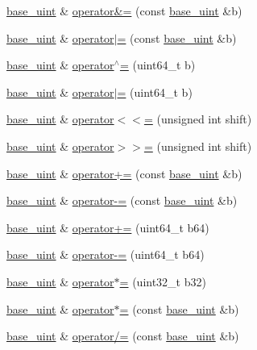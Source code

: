 \begin{DoxyCompactItemize}
\item 
\hyperlink{classbase__uint}{base\+\_\+uint} \& \hyperlink{classbase__uint_a6cb549b322e5bbcca794366f5fd3fb15}{operator\&=} (const \hyperlink{classbase__uint}{base\+\_\+uint} \&b)
\item 
\hyperlink{classbase__uint}{base\+\_\+uint} \& \hyperlink{classbase__uint_ab116d89cbae68b32fbecf5d1de98bb2e}{operator$\vert$=} (const \hyperlink{classbase__uint}{base\+\_\+uint} \&b)
\item 
\hyperlink{classbase__uint}{base\+\_\+uint} \& \hyperlink{classbase__uint_a3d77324f5c5166e4dabadac360bea6e7}{operator$^\wedge$=} (uint64\+\_\+t b)
\item 
\hyperlink{classbase__uint}{base\+\_\+uint} \& \hyperlink{classbase__uint_ac8edb6e097d9eede21f8fa44e9184913}{operator$\vert$=} (uint64\+\_\+t b)
\item 
\hyperlink{classbase__uint}{base\+\_\+uint} \& \hyperlink{classbase__uint_acb449d2fcb5af767fa6b01890e836a4e}{operator$<$$<$=} (unsigned int shift)
\item 
\hyperlink{classbase__uint}{base\+\_\+uint} \& \hyperlink{classbase__uint_a4e0344432bbcce79525fd2c182173b3b}{operator$>$$>$=} (unsigned int shift)
\item 
\hyperlink{classbase__uint}{base\+\_\+uint} \& \hyperlink{classbase__uint_a8fb3109e7c46536bb66ac41242176246}{operator+=} (const \hyperlink{classbase__uint}{base\+\_\+uint} \&b)
\item 
\hyperlink{classbase__uint}{base\+\_\+uint} \& \hyperlink{classbase__uint_a89d8332840076ec102839b8a10dda9b4}{operator-\/=} (const \hyperlink{classbase__uint}{base\+\_\+uint} \&b)
\item 
\hyperlink{classbase__uint}{base\+\_\+uint} \& \hyperlink{classbase__uint_a14f2b12970b3198d65abafb2615207ca}{operator+=} (uint64\+\_\+t b64)
\item 
\hyperlink{classbase__uint}{base\+\_\+uint} \& \hyperlink{classbase__uint_ab64f7a7a87b9af5ea345e4678b4cc1e9}{operator-\/=} (uint64\+\_\+t b64)
\item 
\hyperlink{classbase__uint}{base\+\_\+uint} \& \hyperlink{classbase__uint_aa70b7d954258d2cd4bb77721e357fd40}{operator$\ast$=} (uint32\+\_\+t b32)
\item 
\hyperlink{classbase__uint}{base\+\_\+uint} \& \hyperlink{classbase__uint_a806b2ba843181e9dd4c824414fbcc13d}{operator$\ast$=} (const \hyperlink{classbase__uint}{base\+\_\+uint} \&b)
\item 
\hyperlink{classbase__uint}{base\+\_\+uint} \& \hyperlink{classbase__uint_ad6fa7e22ab995247c0bf298069732e1d}{operator/=} (const \hyperlink{classbase__uint}{base\+\_\+uint} \&b)

\end{DoxyCompactItemize}
